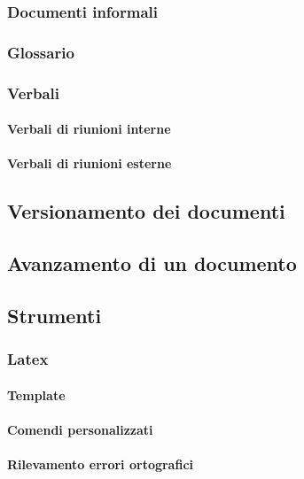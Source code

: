 \documentclass[../NormeProgetto.tex]{subfiles}
\begin{document}
		\subsubsection{Documenti informali}
		\subsubsection{Glossario}
		\subsubsection{Verbali}
			\paragraph{Verbali di riunioni interne}
			\paragraph{Verbali di riunioni esterne}
	\subsection{Versionamento dei documenti}
	\subsection{Avanzamento di un documento}
	\subsection{Strumenti}
		\subsubsection{Latex}
			\paragraph{Template}
			\paragraph{Comendi personalizzati}
			\paragraph{Rilevamento errori ortografici}
			
			
			
\end{document}

